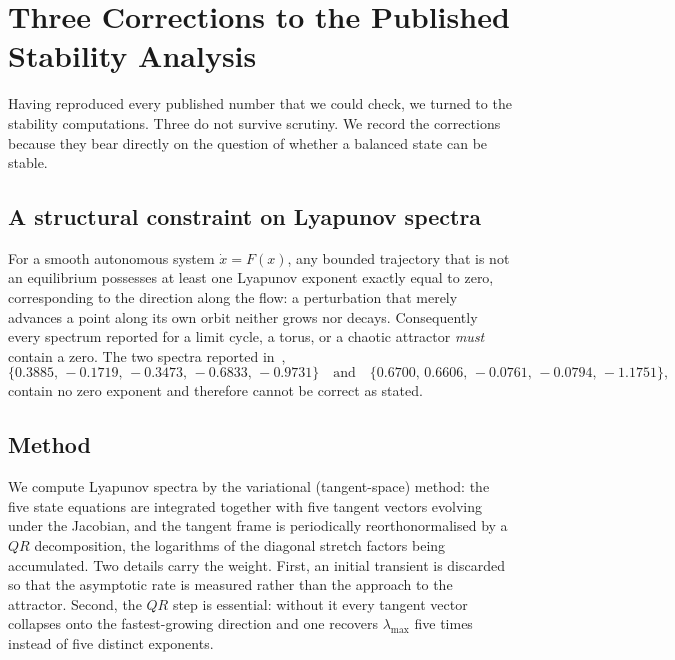 \documentclass[11pt]{article}
\begin{document}
\section{Three Corrections to the Published Stability Analysis}\label{sec:corrections}

Having reproduced every published number that we could check, we turned to the
stability computations. Three do not survive scrutiny. We record the corrections
because they bear directly on the question of whether a balanced state can be
stable.

\subsection{A structural constraint on Lyapunov spectra}

For a smooth autonomous system $\dot x = F(x)$, any bounded trajectory that is
not an equilibrium possesses at least one Lyapunov exponent exactly equal to
zero, corresponding to the direction along the flow: a perturbation that merely
advances a point along its own orbit neither grows nor decays. Consequently
every spectrum reported for a limit cycle, a torus, or a chaotic attractor
\emph{must} contain a zero. The two spectra reported in~\cite{Lin2020},
\[
\{0.3885,\,-0.1719,\,-0.3473,\,-0.6833,\,-0.9731\}
\quad\text{and}\quad
\{0.6700,\,0.6606,\,-0.0761,\,-0.0794,\,-1.1751\},
\]
contain no zero exponent and therefore cannot be correct as stated.

\subsection{Method}

We compute Lyapunov spectra by the variational (tangent-space) method: the five
state equations are integrated together with five tangent vectors evolving under
the Jacobian, and the tangent frame is periodically reorthonormalised by a $QR$
decomposition, the logarithms of the diagonal stretch factors being accumulated.
Two details carry the weight. First, an initial transient is discarded so that
the asymptotic rate is measured rather than the approach to the attractor.
Second, the $QR$ step is essential: without it every tangent vector collapses
onto the fastest-growing direction and one recovers $\lambda_{\max}$ five times
instead of five distinct exponents.
\end{document}
